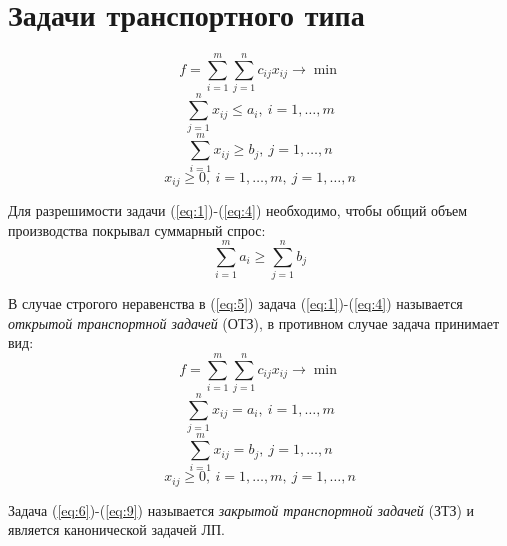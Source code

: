 \section{Задачи транспортного типа}

\begin{equation}\label{eq:1}
	f = \sum_{i=1}^{m} \sum_{j=1}^{n} c_{ij} x_{ij} \rightarrow \min
\end{equation}
\begin{equation}\label{eq:2}
	\sum_{j=1}^{n} x_{ij} \leqslant a_i, \ i = 1,\ldots ,m
\end{equation}
\begin{equation}\label{eq:3}
	\sum_{i=1}^{m} x_{ij} \geqslant b_j, \ j = 1,\ldots ,n
\end{equation}
\begin{equation}\label{eq:4}
	x_{ij} \geqslant 0, \ i = 1,\ldots ,m, \ j = 1,\ldots ,n
\end{equation}

Для разрешимости задачи (\ref{eq:1})-(\ref{eq:4}) необходимо, чтобы общий объем производства покрывал суммарный спрос:
\begin{equation}\label{eq:5}
	\sum_{i=1}^{m} a_i \geqslant \sum_{j=1}^{n} b_j
\end{equation}

\begin{definition}
	В случае строгого неравенства в (\ref{eq:5}) задача (\ref{eq:1})-(\ref{eq:4}) называется \emph{открытой транспортной задачей} (ОТЗ), в противном случае задача принимает вид:
	\begin{equation}\label{eq:6}
		f = \sum_{i=1}^{m} \sum_{j=1}^{n} c_{ij} x_{ij} \rightarrow \min
	\end{equation}
	\begin{equation}\label{eq:7}
		\sum_{j=1}^{n} x_{ij} = a_i, \ i = 1,\ldots ,m
	\end{equation}
	\begin{equation}\label{eq:8}
		\sum_{i=1}^{m} x_{ij} =b_j, \ j=1,\ldots ,n
	\end{equation}
	\begin{equation}\label{eq:9}
		x_{ij} \geqslant 0, \ i = 1,\ldots ,m, \ j=1,\ldots ,n
	\end{equation}
\end{definition}

\begin{definition}
	Задача (\ref{eq:6})-(\ref{eq:9}) называется \emph{закрытой транспортной задачей} (ЗТЗ) и является канонической задачей ЛП.
\end{definition}


